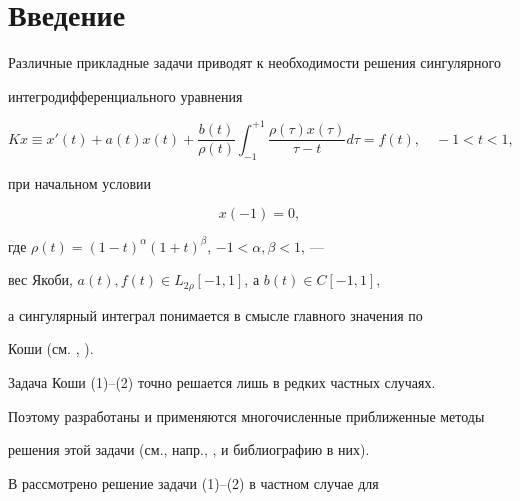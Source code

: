 

\maketitle


\label{begin}








\section*{Введение}





Различные прикладные задачи приводят к необходимости решения сингулярного 


интегродифференциального уравнения


\begin{equation}


Kx\equiv x'(t)+a(t)x(t)+\frac{b(t)}{\rho(t)}


\int_{-1}^{+1}\frac{\rho(\tau)x(\tau)}{\tau-t}d\tau=f(t),\quad -1<t<1,


\end{equation}


при начальном условии


\begin{equation}


x(-1)=0,


\end{equation}


где $\rho(t)=(1-t)^\alpha(1+t)^\beta$, $-1<\alpha,\beta<1$, --- 


вес Якоби, $a(t),f(t)\in L_{2\rho}[-1,1]$, а $b(t)\in C[-1,1]$,


а сингулярный интеграл понимается в смысле главного значения по


Коши (см. \cite{5}, \cite{6}).





Задача Коши (1)--(2) точно решается лишь в редких частных случаях. 


Поэтому разработаны и применяются многочисленные приближенные методы 


решения этой задачи (см., напр., \cite{1}, \cite{3} и библиографию в них). 


В \cite{3} рассмотрено решение задачи (1)--(2) в частном случае для


